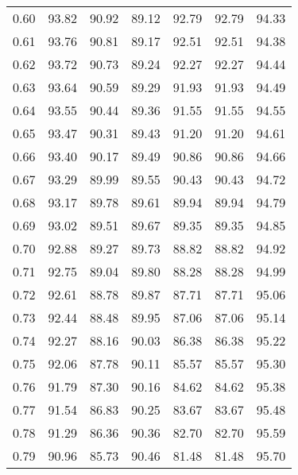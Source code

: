 \begin{tabular}{|c|c|c|c|c|c|c|}
      0.60 &     93.82 &     90.92 &      89.12 &   92.79 &      92.79 &         94.33 \\
      0.61 &     93.76 &     90.81 &      89.17 &   92.51 &      92.51 &         94.38 \\
      0.62 &     93.72 &     90.73 &      89.24 &   92.27 &      92.27 &         94.44 \\
      0.63 &     93.64 &     90.59 &      89.29 &   91.93 &      91.93 &         94.49 \\
      0.64 &     93.55 &     90.44 &      89.36 &   91.55 &      91.55 &         94.55 \\
      0.65 &     93.47 &     90.31 &      89.43 &   91.20 &      91.20 &         94.61 \\
      0.66 &     93.40 &     90.17 &      89.49 &   90.86 &      90.86 &         94.66 \\
      0.67 &     93.29 &     89.99 &      89.55 &   90.43 &      90.43 &         94.72 \\
      0.68 &     93.17 &     89.78 &      89.61 &   89.94 &      89.94 &         94.79 \\
      0.69 &     93.02 &     89.51 &      89.67 &   89.35 &      89.35 &         94.85 \\
      0.70 &     92.88 &     89.27 &      89.73 &   88.82 &      88.82 &         94.92 \\
      0.71 &     92.75 &     89.04 &      89.80 &   88.28 &      88.28 &         94.99 \\
      0.72 &     92.61 &     88.78 &      89.87 &   87.71 &      87.71 &         95.06 \\
      0.73 &     92.44 &     88.48 &      89.95 &   87.06 &      87.06 &         95.14 \\
      0.74 &     92.27 &     88.16 &      90.03 &   86.38 &      86.38 &         95.22 \\
      0.75 &     92.06 &     87.78 &      90.11 &   85.57 &      85.57 &         95.30 \\
      0.76 &     91.79 &     87.30 &      90.16 &   84.62 &      84.62 &         95.38 \\
      0.77 &     91.54 &     86.83 &      90.25 &   83.67 &      83.67 &         95.48 \\
      0.78 &     91.29 &     86.36 &      90.36 &   82.70 &      82.70 &         95.59 \\
      0.79 &     90.96 &     85.73 &      90.46 &   81.48 &      81.48 &         95.70 \\

\end{tabular}

